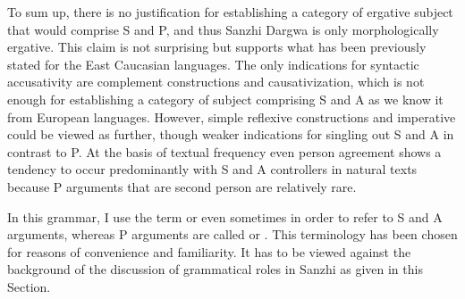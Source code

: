 To sum up, there is no justification for establishing a category of ergative subject that would comprise S and P, and thus Sanzhi Dargwa is only morphologically ergative. This claim is not surprising but supports what has been previously stated for the East Caucasian languages. The only indications for syntactic accusativity are complement constructions and causativization, which is not enough for establishing a category of subject comprising S and A as we know it from European languages. However, simple reflexive constructions and imperative could be viewed as further, though weaker indications for singling out S and A in contrast to P. At the basis of textual frequency even person agreement shows a tendency to occur predominantly with S and A controllers in natural texts because P arguments that are second person are relatively rare. 

In this grammar, I use the term  or even sometimes  in order to refer to S and A arguments, whereas P arguments are called  or . This terminology has been chosen for reasons of convenience and familiarity. It has to be viewed against the background of the discussion of grammatical roles in Sanzhi as given in this Section.


